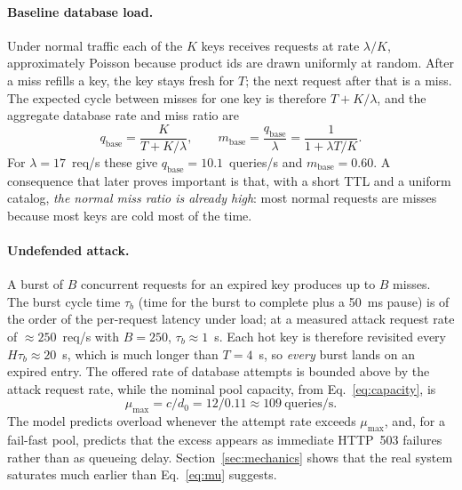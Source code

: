 \paragraph{Baseline database load.} Under normal traffic each of the $K$ keys receives
requests at rate $\lambda/K$, approximately Poisson because product ids are drawn
uniformly at random. After a miss refills a key, the key stays fresh for $T$; the next
request after that is a miss. The expected cycle between misses for one key is
therefore $T + K/\lambda$, and the aggregate database rate and miss ratio are
\begin{equation}
q_{\mathrm{base}} = \frac{K}{T + K/\lambda}, \qquad
m_{\mathrm{base}} = \frac{q_{\mathrm{base}}}{\lambda} = \frac{1}{1+\lambda T/K}.
\label{eq:baseline}
\end{equation}
For $\lambda=17$~req/s these give $q_{\mathrm{base}}=10.1$~queries/s and
$m_{\mathrm{base}}=0.60$. A consequence that later proves important is that, with a
short TTL and a uniform catalog, \emph{the normal miss ratio is already high}: most
normal requests are misses because most keys are cold most of the time.

\paragraph{Undefended attack.} A burst of $B$ concurrent requests for an expired key
produces up to $B$ misses. The burst cycle time $\tau_b$ (time for the burst to
complete plus a 50~ms pause) is of the order of the per-request latency under load; at
a measured attack request rate of ${\approx}250$~req/s with $B=250$, $\tau_b\approx1$~s.
Each hot key is therefore revisited every $H\tau_b\approx20$~s, which is much longer
than $T=4$~s, so \emph{every} burst lands on an expired entry. The offered rate of
database attempts is bounded above by the attack request rate, while the nominal pool
capacity, from Eq.~\eqref{eq:capacity}, is
\begin{equation}
\mu_{\max} = c/d_0 = 12/0.11 \approx 109~\text{queries/s}.
\label{eq:mu}
\end{equation}
The model predicts overload whenever the attempt rate exceeds $\mu_{\max}$, and, for a
fail-fast pool, predicts that the excess appears as immediate HTTP~503 failures rather
than as queueing delay. Section~\ref{sec:mechanics} shows that the real system
saturates much earlier than Eq.~\eqref{eq:mu} suggests.

